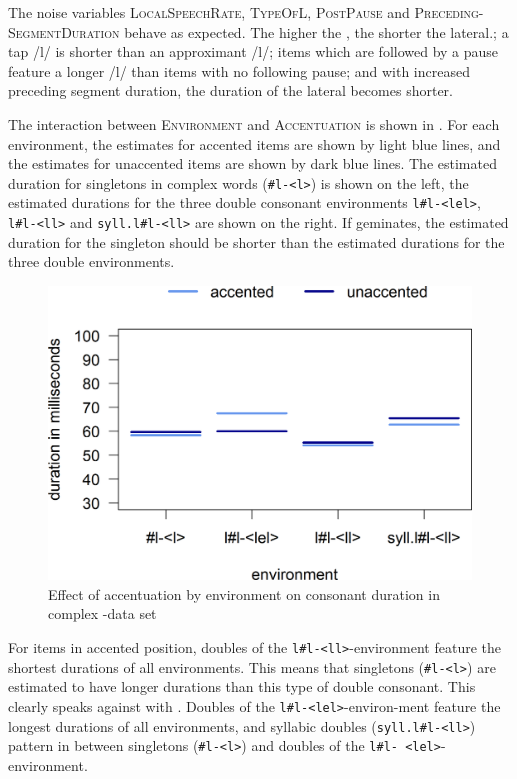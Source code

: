The noise variables \textsc{LocalSpeechRate}, \textsc{TypeOfL}, \textsc{PostPause} and \textsc{Preceding- SegmentDuration} behave as expected. The higher the , the shorter the lateral.; a tap /l/ is shorter than an approximant /l/; items which are followed by a pause feature a longer /l/ than items with no following pause; and with increased preceding segment duration, the duration of the lateral becomes shorter.



The interaction between \textsc{Environment} and \textsc{Accentuation} is shown in . 
For each environment, the estimates for accented items are shown by light blue lines, and the estimates for unaccented items are shown by dark blue lines. The estimated duration for singletons in complex words (\texttt{\#l-<l>}) is shown on the left, the estimated durations for the three double consonant environments \texttt{l\#l-<lel>}, \texttt{l\#l-<ll>} and \texttt{syll.l\#l-<ll>} are shown on the right. If  geminates, the estimated duration for the singleton should be shorter than the estimated durations for the three double environments. 


\begin{figure}
	
	\includegraphics [scale=0.5] {images/Experiment/LyModelInterEnvAcc}
	\caption{Effect of accentuation by environment on consonant duration in complex -data set}
	\label{fig:Env Acc lyComplex experiment}
\end{figure}

For items in accented position, doubles of the \texttt{l\#l-<ll>}-environment feature the shortest durations of all environments. This means that singletons (\texttt{\#l-<l>}) are estimated to have longer durations than this type of double consonant. This clearly speaks against  with . Doubles of the \texttt{l\#l-<lel>}-environ-ment feature the longest durations of all environments, and syllabic doubles (\texttt{syll.l\#l-<ll>}) pattern in between singletons  (\texttt{\#l-<l>}) and doubles of the \texttt{l\#l- <lel>}- environment.


